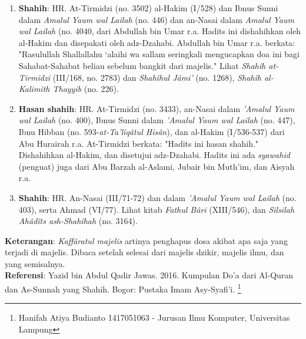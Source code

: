 \documentclass[a4paper,12pt]{article}
\begin{document}
\begin{enumerate}
\item \textbf{Shahih}: HR. At-Tirmidzi (no. 3502) al-Hakim (I/528) dan 
Ibnus Sunni dalam \textit{Amalul Yaum wal Lailah} (no. 446) dan an-Nasai 
dalam \textit{Amalul Yaum wal Lailah} (no. 4040, dari Abdullah bin Umar 
r.a. Hadits ini dishahihkan oleh al-Hakim dan disepakati oleh adz-Dzahabi. 
Abdullah bin Umar r.a. berkata: "Rasulullah Shallallahu ‘alaihi wa sallam 
seringkali mengucapkan doa ini bagi Sahabat-Sahabat beliau sebelum bangkit 
dari majelis." Lihat \textit{Shah\^{i}h at-Tirmidzi} (III/168, no. 2783) 
dan \textit{Shah\^{i}hul J\^{a}mi'} (no. 1268), \textit{Shah\^{i}h 
al-Kalimith Thayyib} (no. 226).
\item \textbf{Hasan shahih}: HR. At-Tirmidzi (no. 3433), an-Nasai dalam 
\textit{'Amalul Yaum wal Lailah} (no. 400), Ibnus Sunni dalam 
\textit{'Amalul Yaum wal Lailah} (no. 447), Ibnu Hibban (no. 
593-\textit{at-Ta'l\^{i}q\^{a}tul His\^{a}n}), dan al-Hakim (I/536-537) 
dari Abu Hurairah r.a. At-Tirmidzi berkata: "Hadits ini hasan shahih." 
Dishahihkan al-Hakim, dan disetujui adz-Dzahabi. Hadits ini ada 
\textit{syawahid} (penguat) juga dari Abu Barzah al-Aslami, Jubair bin 
Muth'im, dan Aisyah r.a.
\item \textbf{Shahih}: HR. An-Nasai (III/71-72) dan dalam \textit{'Amalul 
Yaum wal Lailah} (no. 403), serta Ahmad (VI/77). Lihat kitab \textit{Fathul
B\^{a}ri} (XIII/546), dan \textit{Silsilah Ah\^{a}d\^{i}ts 
ash-Shah\^{i}hah} (no. 3164).
\end{enumerate}
\textbf{Keterangan}: \textit{Kaff\^{a}ratul majelis} artinya penghapus 
dosa akibat apa saja yang terjadi di majelis. Dibaca setelah selesai dari 
majelis dzikir, majelis ilmu, dan yang semisalnya. \\
\textbf{Referensi}: Yazid bin Abdul Qadir Jawas. 2016. Kumpulan Do'a dari
Al-Quran dan As-Sunnah yang Shahih. Bogor: Pustaka Imam Asy-Syafi'i.
\footnote{Hanifah Atiya Budianto 1417051063 - Jurusan Ilmu Komputer,
Universitas Lampung}
\end{document}
